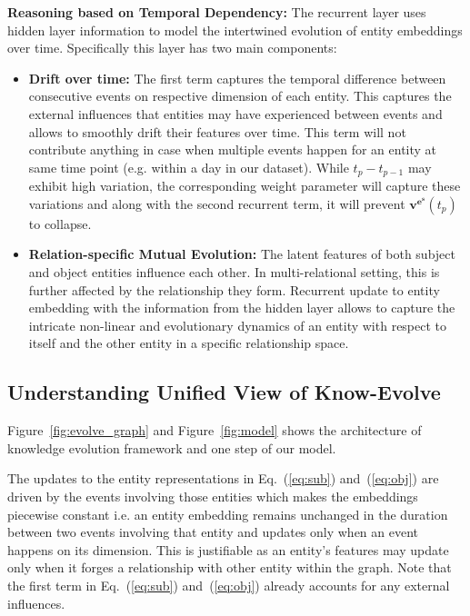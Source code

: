\documentclass{article}
\begin{document}
{\bf Reasoning based on Temporal Dependency:}
The recurrent layer uses hidden layer information to model the intertwined evolution of entity embeddings over time. Specifically this layer has two main components:
\begin{itemize}[leftmargin=*,nosep]
\item {\bf Drift over time:} The first term captures the temporal difference between consecutive events on respective dimension of each entity. This captures the external influences that entities may have experienced between events and allows to smoothly drift their features over time. This term will not contribute anything in case when multiple events happen for an entity at same time point (e.g. within a day in our dataset). While $t_p - t_{p-1}$ may exhibit high variation, the corresponding weight parameter will capture these variations and along with the second recurrent term, it will prevent $\mathbf{v^{e^s}}(t_p)$ to collapse.

\vspace{0.2cm}
\item {\bf Relation-specific Mutual Evolution:} The latent features of both subject and object entities influence each other. In multi-relational setting, this is further affected by the relationship they form. Recurrent update to entity embedding with the information from the hidden layer allows to capture the intricate non-linear and evolutionary dynamics of an entity with respect to itself and the other entity in a specific relationship space. 

\end{itemize}
\vspace{-0.2cm}
\subsection{Understanding Unified View of Know-Evolve}

Figure~\ref{fig:evolve_graph} and Figure~\ref{fig:model} shows the architecture of knowledge evolution framework and one step of our model.

The updates to the entity representations in Eq.~(\ref{eq:sub}) and~(\ref{eq:obj}) are driven by the events involving those entities which makes the embeddings piecewise constant i.e. an  entity embedding remains unchanged in the duration between two events involving that entity and updates only when an event happens on its dimension. This is justifiable as an entity's features may update only when it forges a relationship with other entity within the graph. Note that the first term in Eq.~(\ref{eq:sub}) and~(\ref{eq:obj}) already accounts for any external influences. 
\end{document}
